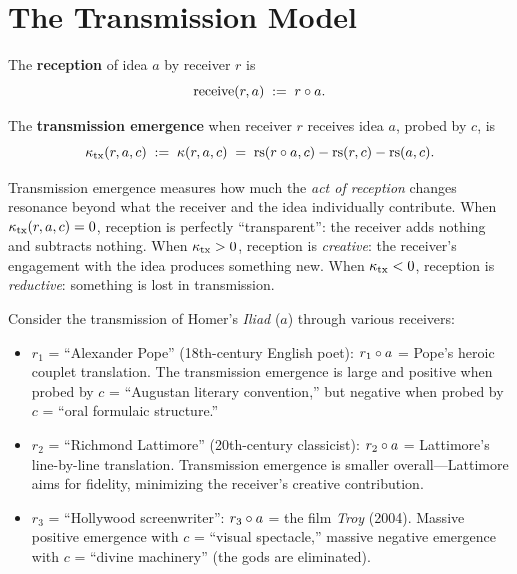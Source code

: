 \section{The Transmission Model}

\begin{definition}[Reception]\label{def:reception}
The \textbf{reception} of idea $a$ by receiver $r$ is
\[
    \mathrm{receive}(r, a) \;:=\; r \circ a.
\]
\end{definition}

\begin{definition}\label{def:transmission-emergence}
The \textbf{transmission emergence} when receiver $r$ receives idea $a$,
probed by $c$, is
\[
    \kappa_{\mathrm{tx}}(r, a, c) \;:=\; \kappa(r, a, c)
    \;=\; \mathrm{rs}(r \circ a, c) - \mathrm{rs}(r, c) - \mathrm{rs}(a, c).
\]
\end{definition}

\begin{interpretation}
Transmission emergence measures how much the \emph{act of reception}
changes resonance beyond what the receiver and the idea individually
contribute. When $\kappa_{\mathrm{tx}}(r, a, c) = 0$, reception is
perfectly ``transparent'': the receiver adds nothing and subtracts
nothing. When $\kappa_{\mathrm{tx}} > 0$, reception is
\emph{creative}: the receiver's engagement with the idea produces
something new. When $\kappa_{\mathrm{tx}} < 0$, reception is
\emph{reductive}: something is lost in transmission.
\end{interpretation}

\begin{example}
Consider the transmission of Homer's \emph{Iliad} ($a$) through various
receivers:
\begin{itemize}
    \item $r_1$ = ``Alexander Pope'' (18th-century English poet):
    $r_1 \circ a$ = Pope's heroic couplet translation. The
    transmission emergence is large and positive when probed by
    $c$ = ``Augustan literary convention,'' but negative when probed
    by $c$ = ``oral formulaic structure.''

    \item $r_2$ = ``Richmond Lattimore'' (20th-century classicist):
    $r_2 \circ a$ = Lattimore's line-by-line translation.
    Transmission emergence is smaller overall---Lattimore aims for
    fidelity, minimizing the receiver's creative contribution.

    \item $r_3$ = ``Hollywood screenwriter'': $r_3 \circ a$ =
    the film \emph{Troy} (2004). Massive positive emergence with
    $c$ = ``visual spectacle,'' massive negative emergence with
    $c$ = ``divine machinery'' (the gods are eliminated).
\end{itemize}
\end{example}

